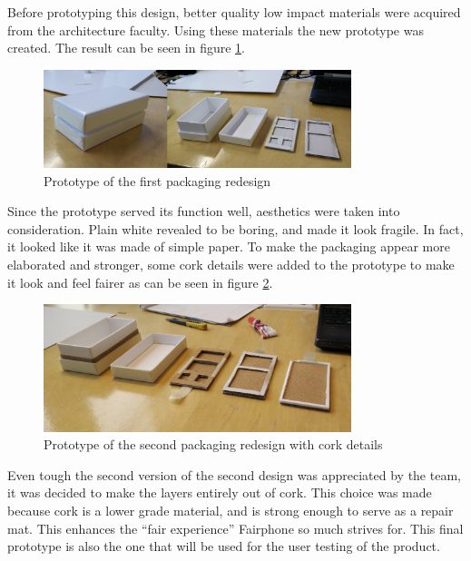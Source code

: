 \documentclass[final,a4paper]{report} %
\begin{document}
	Before prototyping this design, better quality low impact materials were acquired from the architecture faculty. Using these materials the new prototype was created. The result can be seen in figure \ref{fig:Prototype of box design 2}.
	
	\begin{figure}[H]
		\centering
		\includegraphics[width=0.8\textwidth]{resources/BoxPrototype21}
		\caption{Prototype of the first packaging redesign}
		\label{fig:Prototype of box design 2}
	\end{figure}
	
	Since the prototype served its function well, aesthetics were taken into consideration. Plain white revealed to be boring, and made it look fragile. In fact, it looked like it was made of simple paper. To make the packaging appear more elaborated and stronger, some cork details were added to the prototype to make it look and feel fairer as can be seen in figure \ref{fig:Prototype of box design 2 with cork details}.
	
	\begin{figure}[H]
		\centering
		\includegraphics[width=0.8\textwidth]{resources/BoxPrototype22}
		\caption{Prototype of the second packaging redesign with cork details}
		\label{fig:Prototype of box design 2 with cork details}
	\end{figure}
	
	Even tough the second version of the second design was appreciated by the team, it was decided to make the layers entirely out of cork. This choice was made because cork is a lower grade material, and is strong enough to serve as a repair mat. This enhances the ``fair experience'' Fairphone so much strives for. This final prototype is also the one that will be used for the user testing of the product.
	
\end{document}
